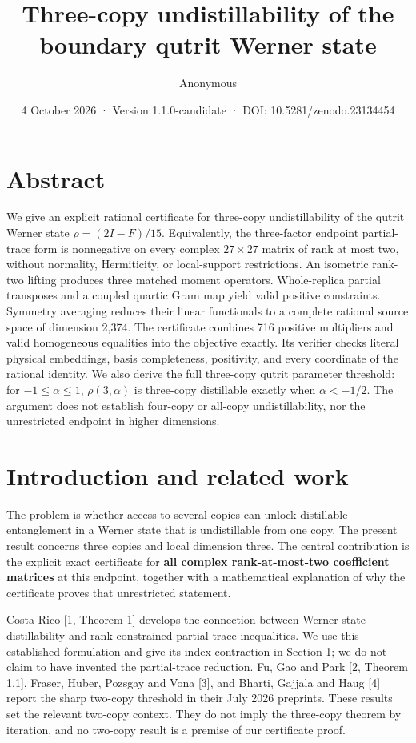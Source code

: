 \documentclass[
  11pt,
]{article}
\title{Three-copy undistillability of the boundary qutrit Werner state}
\author{Anonymous}
\date{4 October 2026 · Version 1.1.0-candidate · DOI:
10.5281/zenodo.23134454}
\begin{document}
\maketitle

\section{Abstract}\label{abstract}

We give an explicit rational certificate for three-copy undistillability
of the qutrit Werner state \(\rho=(2I-F)/15\). Equivalently, the
three-factor endpoint partial-trace form is nonnegative on every complex
\(27\times27\) matrix of rank at most two, without normality,
Hermiticity, or local-support restrictions. An isometric rank-two
lifting produces three matched moment operators. Whole-replica partial
transposes and a coupled quartic Gram map yield valid positive
constraints. Symmetry averaging reduces their linear functionals to a
complete rational source space of dimension 2,374. The certificate
combines 716 positive multipliers and valid homogeneous equalities into
the objective exactly. Its verifier checks literal physical embeddings,
basis completeness, positivity, and every coordinate of the rational
identity. We also derive the full three-copy qutrit parameter threshold:
for \(-1\leq\alpha\leq1\), \(\rho(3,\alpha)\) is three-copy distillable
exactly when \(\alpha<-1/2\). The argument does not establish four-copy
or all-copy undistillability, nor the unrestricted endpoint in higher
dimensions.

\section{Introduction and related
work}\label{introduction-and-related-work}

The problem is whether access to several copies can unlock distillable
entanglement in a Werner state that is undistillable from one copy. The
present result concerns three copies and local dimension three. The
central contribution is the explicit exact certificate for \textbf{all
complex rank-at-most-two coefficient matrices} at this endpoint,
together with a mathematical explanation of why the certificate proves
that unrestricted statement.

Costa Rico {[}1, Theorem 1{]} develops the connection between
Werner-state distillability and rank-constrained partial-trace
inequalities. We use this established formulation and give its index
contraction in Section 1; we do not claim to have invented the
partial-trace reduction. Fu, Gao and Park {[}2, Theorem 1.1{]}, Fraser,
Huber, Pozsgay and Vona {[}3{]}, and Bharti, Gajjala and Haug {[}4{]}
report the sharp two-copy threshold in their July 2026 preprints. These
results set the relevant two-copy context. They do not imply the
three-copy theorem by iteration, and no two-copy result is a premise of
our certificate proof.
\end{document}
